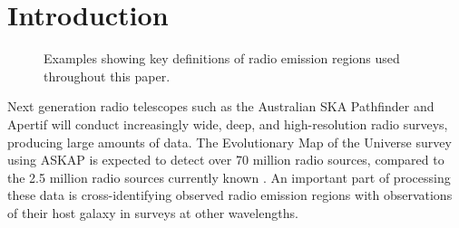 \documentclass[fleqn,usenatbib,usedcolumn]{mnras}
\begin{document}

\section{Introduction}\label{introduction}

    \begin{figure}
        \centering
        \quad
        \quad
        \caption{\label{fig:definitions} Examples showing key definitions of radio emission regions used throughout this paper.}
    \end{figure}

  Next generation radio telescopes such as the Australian SKA Pathfinder
  \citep[ASKAP;][]{johnston07} and Apertif \citep{verheijen08} will conduct
  increasingly wide, deep, and high-resolution radio surveys, producing large
  amounts of data. The Evolutionary Map of the Universe
  \citep[EMU;][]{norris11} survey using ASKAP is expected to detect over 70 million
  radio sources, compared to the 2.5 million radio sources currently
  known \citep{banfield15}. An important part of processing these data is cross-identifying observed
  radio emission regions with observations of their host galaxy in surveys at
  other wavelengths.
\end{document}

